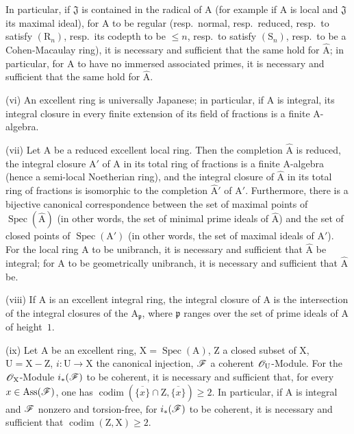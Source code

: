 \begin{scholium}[7.8.3]
In particular, if $\mathfrak{J}$ is contained in the radical of $\mathrm{A}$ (for example if $\mathrm{A}$ is local and $\mathfrak{J}$ its maximal ideal), for $\mathrm{A}$ to be regular (resp.\ normal, resp.\ reduced, resp.\ to satisfy $(\mathrm{R}_n)$, resp.\ its codepth to be $\leqslant n$, resp.\ to satisfy $(\mathrm{S}_n)$, resp.\ to be a Cohen-Macaulay ring), it is necessary and sufficient that the same hold for $\widehat{\mathrm{A}}$; in particular, for $\mathrm{A}$ to have no immersed associated primes, it is necessary and sufficient that the same hold for $\widehat{\mathrm{A}}$.

(vi) An excellent ring is universally Japanese; in particular, if $\mathrm{A}$ is integral, its integral closure in every finite extension of its field of fractions is a finite $\mathrm{A}$-algebra.

(vii) Let $\mathrm{A}$ be a reduced excellent local ring. Then the completion $\widehat{\mathrm{A}}$ is reduced, the integral closure $\mathrm{A}'$ of $\mathrm{A}$ in its total ring of fractions is a finite $\mathrm{A}$-algebra (hence a semi-local Noetherian ring), and the integral closure of $\widehat{\mathrm{A}}$ in its total ring of fractions is isomorphic to the completion $\widehat{\mathrm{A}}'$ of $\mathrm{A}'$. Furthermore, there is a bijective canonical correspondence between the set of maximal points of $\operatorname{Spec}(\widehat{\mathrm{A}})$ (in other words, the set of minimal prime ideals of $\widehat{\mathrm{A}}$) and the set of closed points of $\operatorname{Spec}(\mathrm{A}')$ (in other words, the set of maximal ideals of $\mathrm{A}'$). For the local ring $\mathrm{A}$ to be unibranch, it is necessary and sufficient that $\widehat{\mathrm{A}}$ be integral; for $\mathrm{A}$ to be geometrically unibranch, it is necessary and sufficient that $\widehat{\mathrm{A}}$ be.

(viii) If $\mathrm{A}$ is an excellent integral ring, the integral closure of $\mathrm{A}$ is the intersection of the integral closures of the $\mathrm{A}_\mathfrak{p}$, where $\mathfrak{p}$ ranges over the set of prime ideals of $\mathrm{A}$ of height~$1$.

(ix) Let $\mathrm{A}$ be an excellent ring, $\mathrm{X}=\operatorname{Spec}(\mathrm{A})$, $\mathrm{Z}$ a closed subset of $\mathrm{X}$, $\mathrm{U}=\mathrm{X}-\mathrm{Z}$, $i:\mathrm{U}\to\mathrm{X}$ the canonical injection, $\mathscr{F}$ a coherent $\mathscr{O}_\mathrm{U}$-Module. For the $\mathscr{O}_\mathrm{X}$-Module $i_*(\mathscr{F})$ to be coherent, it is necessary and sufficient that, for every $x\in\operatorname{Ass}(\mathscr{F})$, one has $\operatorname{codim}(\overline{\{x\}}\cap\mathrm{Z},\overline{\{x\}})\geqslant 2$. In particular, if $\mathrm{A}$ is integral and $\mathscr{F}$ nonzero and torsion-free, for $i_*(\mathscr{F})$ to be coherent, it is necessary and sufficient that $\operatorname{codim}(\mathrm{Z},\mathrm{X})\geqslant 2$.


\end{scholium}
